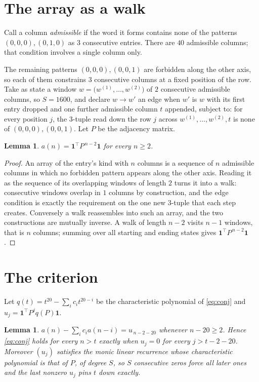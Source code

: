 \documentclass[11pt,a4paper]{article}
\theoremstyle{plain}
\newtheorem{lemma}[theorem]{Lemma}
\theoremstyle{definition}
\begin{document}
\section{The array as a walk}

Call a column \emph{admissible} if the word it forms contains none of the patterns
$(0,0,0), (0,1,0)$ as $3$ consecutive entries. There are $40$ admissible columns; that condition
involves a single column only.

The remaining patterns $(0,0,0), (0,0,1)$ are forbidden along the other axis, so each of them
constrains $3$ consecutive columns at a fixed position of the row. Take as state a
window $w=\bigl(w^{(1)},\dots,w^{(2)}\bigr)$ of $2$ consecutive admissible
columns, so $S=1600$, and declare $w\to w'$ an edge when $w'$ is $w$ with its first entry
dropped and one further admissible column $t$ appended, subject to: for every position
$j$, the $3$-tuple read down the row $j$ across $w^{(1)},\dots,w^{(2)},t$
is none of $(0,0,0), (0,0,1)$. Let $P$ be the adjacency matrix.

\begin{lemma}\label{lem:walk}
$a(n)=\mathbf{1}^{\!\top}P^{\,n-2}\mathbf{1}$ for every $n\ge2$.
\end{lemma}

\begin{proof}
An array of the entry's kind with $n$ columns is a sequence of $n$ admissible columns in
which no forbidden pattern appears along the other axis. Reading it as the sequence of its
overlapping windows of length $2$ turns it into a walk: consecutive windows overlap in
$1$ columns by construction, and the edge condition is exactly the requirement on the one
new $3$-tuple that each step creates. Conversely a walk reassembles into such an array,
and the two constructions are mutually inverse. A walk of length $n-2$ visits $n-1$
windows, that is $n$ columns; summing over all starting and ending states gives
$\mathbf{1}^{\!\top}P^{\,n-2}\mathbf{1}$.
\end{proof}

\section{The criterion}

Let $q(t)=t^{20}-\sum_i c_i t^{20-i}$ be the characteristic polynomial of
\eqref{eq:conj} and $u_j=\mathbf{1}^{\!\top}P^{j}q(P)\mathbf{1}$.

\begin{lemma}\label{lem:crit}
$a(n)-\sum_i c_i a(n-i)=u_{\,n-2-20}$ whenever $n-20\ge2$. Hence
\eqref{eq:conj} holds for every $n>t$ exactly when $u_j=0$ for every
$j>t-2-20$. Moreover $(u_j)$ satisfies the monic linear recurrence whose
characteristic polynomial is that of $P$, of degree $S$, so $S$ consecutive zeros force all
later ones and the last nonzero $u_j$ pins $t$ down exactly.
\end{lemma}
\end{document}
